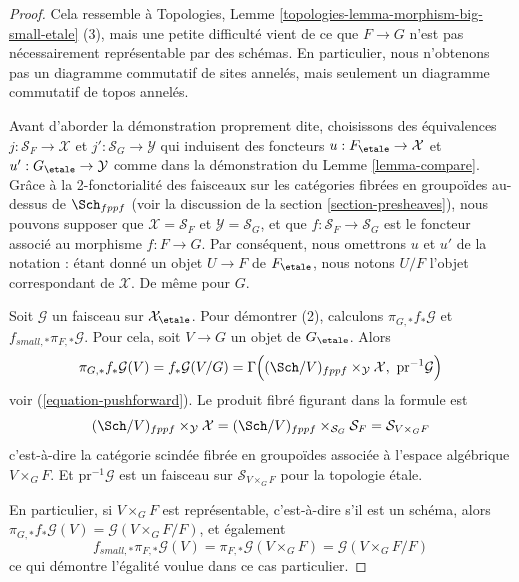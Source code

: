 \begin{proof}
Cela ressemble à
Topologies, Lemme \ref{topologies-lemma-morphism-big-small-etale} (3),
mais une petite difficulté vient de ce que $F \to G$ n'est pas nécessairement
représentable par des schémas. En particulier, nous n'obtenons pas un diagramme commutatif
de sites annelés, mais seulement un diagramme commutatif de topos annelés.

\medskip\noindent
Avant d'aborder la démonstration proprement dite, choisissons des équivalences
$j : \mathcal{S}_F \to \mathcal{X}$ et
$j' : \mathcal{S}_G \to \mathcal{Y}$ qui induisent des foncteurs
$u : F_\etale \to \mathcal{X}$ et
$u' : G_\etale \to \mathcal{Y}$ comme dans la démonstration du
Lemme \ref{lemma-compare}. Grâce à la 2-fonctorialité des
faisceaux sur les catégories fibrées en groupoïdes au-dessus de $\Sch_{fppf}$
(voir la discussion de la section \ref{section-presheaves}),
nous pouvons supposer que $\mathcal{X} = \mathcal{S}_F$ et
$\mathcal{Y} = \mathcal{S}_G$, et que $f : \mathcal{S}_F \to \mathcal{S}_G$
est le foncteur associé au morphisme $f : F \to G$. Par conséquent,
nous omettrons $u$ et $u'$ de la notation : étant donné un objet
$U \to F$ de $F_\etale$, nous notons $U/F$
l'objet correspondant de $\mathcal{X}$. De même pour $G$.

\medskip\noindent
Soit $\mathcal{G}$ un faisceau sur $\mathcal{X}_\etale$.
Pour démontrer (2), calculons $\pi_{G, *}f_*\mathcal{G}$ et
$f_{small, *}\pi_{F, *}\mathcal{G}$. Pour cela, soit $V \to G$ un objet
de $G_\etale$. Alors
$$
\pi_{G, *}f_*\mathcal{G}(V) = f_*\mathcal{G}(V/G) =
\Gamma\Big(
(\Sch/V)_{fppf} \times_{\mathcal{Y}} \mathcal{X},
\ \text{pr}^{-1}\mathcal{G}\Big)
$$
voir (\ref{equation-pushforward}). Le produit fibré figurant dans la formule est
$$
(\Sch/V)_{fppf} \times_{\mathcal{Y}} \mathcal{X} =
(\Sch/V)_{fppf} \times_{\mathcal{S}_G} \mathcal{S}_F =
\mathcal{S}_{V \times_G F}
$$
c'est-à-dire la catégorie scindée fibrée en groupoïdes associée à
l'espace algébrique $V \times_G F$. Et $\text{pr}^{-1}\mathcal{G}$ est un
faisceau sur $\mathcal{S}_{V \times_G F}$ pour la topologie \'etale.

\medskip\noindent
En particulier, si $V \times_G F$ est représentable, c'est-à-dire s'il est un schéma,
alors $\pi_{G, *}f_*\mathcal{G}(V) = \mathcal{G}(V \times_G F/F)$, et
également
$$
f_{small, *}\pi_{F, *}\mathcal{G}(V) =
\pi_{F, *}\mathcal{G}(V \times_G F) =
\mathcal{G}(V \times_G F/F)
$$
ce qui démontre l'égalité voulue dans ce cas particulier.


\end{proof}
